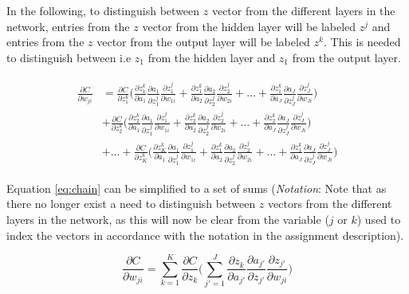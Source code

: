 \documentclass{article}
\begin{document}
In the following, to distinguish between $z$ vector from the different layers in the network, entries from the $z$ vector from the hidden layer will be labeled $z^j$ and entries from the $z$ vector from the output layer will be labeled $z^k$. This is needed to distinguish between i.e $z_{1}$ from the hidden layer and $z_1$ from the output layer.

\begin{align}
\begin{split}
    \frac{\partial C}{\partial w_{ji}} &= \frac{\partial C}{\partial z_1^k} \Bigg( 
    \frac{\partial z_1^k}{\partial a_1}\frac{\partial a_1}{\partial  z^j_1} \frac{\partial z^j_1}{\partial w_{1i}} + \frac{\partial z_1^k}{\partial a_2}\frac{\partial a_2}{\partial  z^j_2} \frac{\partial z^j_2}{\partial w_{2i}} + \dots + \frac{\partial z_1^k}{\partial a_J}\frac{\partial a_J}{\partial  z^j_J} \frac{\partial z^j_J}{\partial w_{Ji}}\Bigg) \\
    &+ \frac{\partial C}{\partial z_2^k} \Bigg( 
    \frac{\partial z_2^k}{\partial a_1}\frac{\partial a_1}{\partial  z^j_1} \frac{\partial z^j_1}{\partial w_{1i}} + \frac{\partial z_2^k}{\partial a_2}\frac{\partial a_2}{\partial  z^j_2} \frac{\partial z^j_2}{\partial w_{2i}} + \dots + \frac{\partial z_2^k}{\partial a_J}\frac{\partial a_J}{\partial  z^j_J} \frac{\partial z^j_J}{\partial w_{Ji}}\Bigg) \\
    &+ \dots + \frac{\partial C}{\partial z_K^k} \Bigg( 
    \frac{\partial z_K^k}{\partial a_1}\frac{\partial a_1}{\partial  z^j_1} \frac{\partial z^j_1}{\partial w_{1i}} + \frac{\partial z_1^k}{\partial a_2}\frac{\partial a_2}{\partial  z^j_2} \frac{\partial z^j_2}{\partial w_{2i}} + \dots + \frac{\partial z_1^k}{\partial a_J}\frac{\partial a_J}{\partial  z^j_J} \frac{\partial z^j_J}{\partial w_{Ji}}\Bigg) 
\end{split} \label{eq:chain}
\end{align}

Equation \eqref{eq:chain} can be simplified to a set of sums (\textit{Notation}: Note that as there no longer exist a need to distinguish between $z$ vectors from the different layers in the network, as this will now be clear from the variable ($j$ or $k$) used to index the vectors in accordance with the notation in the assignment description).   

\begin{equation}
    \frac{\partial C}{\partial w_{ji}} = \sum_{k=1}^K \frac{\partial C}{\partial z_k}\Bigg( \sum_{j'=1}^J \frac{\partial z_k}{\partial a_{j'}}\frac{\partial a_{j'}}{\partial z_{j'}}\frac{\partial z_{j'}}{\partial w_{ji}} \Bigg)
    \label{eq:chain_sum}
\end{equation}
\end{document}
